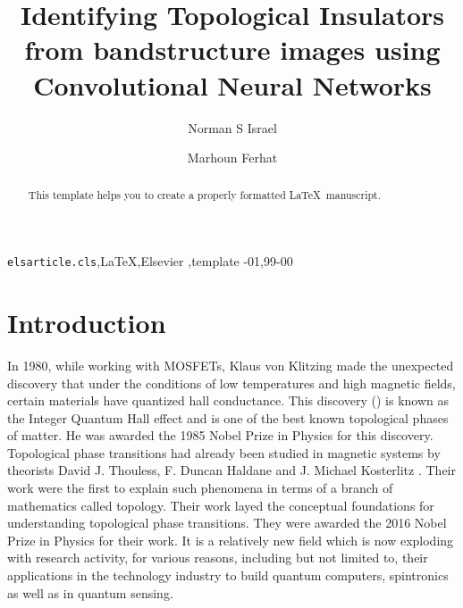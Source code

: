 \documentclass[review]{elsarticle}
\begin{document}
\begin{frontmatter}

\title{Identifying Topological Insulators from bandstructure images using Convolutional Neural Networks}

\author{Norman S Israel}
\address{The University of the West Indies, Mona, Kingston, Jamaica}

\author{Marhoun Ferhat}
\address{The University of the West Indies, Mona, Kingston, Jamaica}




\begin{abstract}
This template helps you to create a properly formatted \LaTeX\ manuscript.
\end{abstract}

\begin{keyword}
\texttt{elsarticle.cls}\sep \LaTeX\sep Elsevier \sep template
-01\sep  99-00
\end{keyword}

\end{frontmatter}


\section{Introduction}

In 1980, while working with MOSFETs, Klaus von Klitzing made the unexpected discovery that under the conditions of low temperatures and high magnetic fields, certain materials have quantized hall conductance. This discovery (\cite{klitzing_etal}) is known as the Integer Quantum Hall effect and is one of the best known topological phases of matter. He was awarded the 1985 Nobel Prize in Physics for this discovery. Topological phase transitions had already been studied in magnetic systems by theorists David J. Thouless, F. Duncan Haldane and J. Michael Kosterlitz \cite{haldane, Thouless_etal, haldanemag, kosterlitz, kosterlitz_thouless, kos_thou}. Their work were the first to explain such phenomena in terms of a branch of mathematics called topology. Their work layed the conceptual foundations for understanding topological phase transitions. They were awarded the 2016 Nobel Prize in Physics for their work. It is a relatively new field which is now exploding with research activity, for various reasons, including but not limited to, their applications in the technology industry to build quantum computers, spintronics as well as in quantum sensing.
\end{document}
